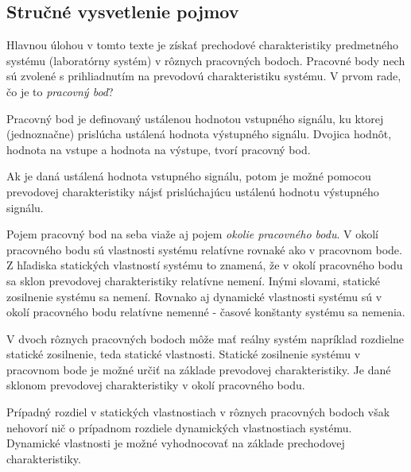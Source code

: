 \documentclass[a4paper, 10pt, ]{article}
\begin{document}
\begin{figure}[t]
	\centering


    \vspace{-4mm}

	\caption{}
	\label{Prevodová charakteristika graf4}

\end{figure}






\subsection{Stručné vysvetlenie pojmov}

Hlavnou úlohou v tomto texte je získať prechodové charakteristiky predmetného systému (laboratórny systém) v rôznych pracovných bodoch. Pracovné body nech sú zvolené s prihliadnutím na prevodovú charakteristiku systému. V prvom rade, čo je to \emph{pracovný bod}?


\bigskip


Pracovný bod je definovaný ustálenou hodnotou vstupného signálu, ku ktorej (jednoznačne) prislúcha ustálená hodnota výstupného signálu. Dvojica hodnôt, hodnota na vstupe a hodnota na výstupe, tvorí pracovný bod.

Ak je daná ustálená hodnota vstupného signálu, potom je možné pomocou prevodovej charakteristiky nájsť prislúchajúcu ustálenú hodnotu výstupného signálu.

Pojem pracovný bod na seba viaže aj pojem \emph{okolie pracovného bodu}. V okolí pracovného bodu sú vlastnosti systému relatívne rovnaké ako v pracovnom bode. Z hľadiska statických vlastností systému to znamená, že v okolí pracovného bodu sa sklon prevodovej charakteristiky relatívne nemení. Inými slovami, statické zosilnenie systému sa nemení. Rovnako aj dynamické vlastnosti systému sú v okolí pracovného bodu relatívne nemenné - časové konštanty systému sa nemenia.

V dvoch rôznych pracovných bodoch môže mať reálny systém napríklad rozdielne statické zosilnenie, teda statické vlastnosti. Statické zosilnenie systému v pracovnom bode je možné určiť na základe prevodovej charakteristiky. Je dané sklonom prevodovej charakteristiky v okolí pracovného bodu.

Prípadný rozdiel v statických vlastnostiach v rôznych pracovných bodoch však nehovorí nič o prípadnom rozdiele dynamických vlastnostiach systému. Dynamické vlastnosti je možné vyhodnocovať na základe prechodovej charakteristiky.
\end{document}
